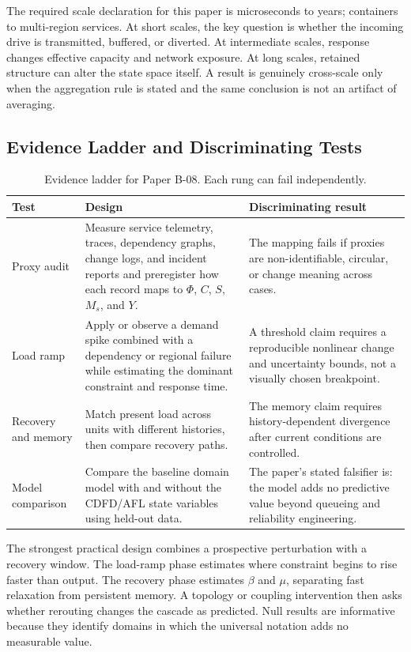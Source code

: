 \documentclass[11pt,a4paper]{article}
\begin{document}
The required scale declaration for this paper is microseconds to years; containers to multi-region services. At short
scales, the key question is whether the incoming drive is transmitted,
buffered, or diverted. At intermediate scales, response changes effective
capacity and network exposure. At long scales, retained structure can alter the
state space itself. A result is genuinely cross-scale only when the aggregation
rule is stated and the same conclusion is not an artifact of averaging.

\subsection{Evidence Ladder and Discriminating Tests}

\begin{table}[htbp]
\centering
\small
\caption{Evidence ladder for Paper B-08. Each rung can fail independently.}
\begin{tabularx}{\textwidth}{|p{}|X|X|}
\hline
\textbf{Test} & \textbf{Design} & \textbf{Discriminating result} \\
\hline
Proxy audit & Measure service telemetry, traces, dependency graphs, change logs, and incident reports and preregister how each record maps to $\Phi$, $C$, $S$, $M_s$, and $Y$. & The mapping fails if proxies are non-identifiable, circular, or change meaning across cases. \\
\hline
Load ramp & Apply or observe a demand spike combined with a dependency or regional failure while estimating the dominant constraint and response time. & A threshold claim requires a reproducible nonlinear change and uncertainty bounds, not a visually chosen breakpoint. \\
\hline
Recovery and memory & Match present load across units with different histories, then compare recovery paths. & The memory claim requires history-dependent divergence after current conditions are controlled. \\
\hline
Model comparison & Compare the baseline domain model with and without the CDFD/AFL state variables using held-out data. & The paper's stated falsifier is: the model adds no predictive value beyond queueing and reliability engineering. \\
\hline
\end{tabularx}
\end{table}

The strongest practical design combines a prospective perturbation with a
recovery window. The load-ramp phase estimates where constraint begins to rise
faster than output. The recovery phase estimates $\beta$ and $\mu$, separating
fast relaxation from persistent memory. A topology or coupling intervention
then asks whether rerouting changes the cascade as predicted. Null results are
informative because they identify domains in which the universal notation adds
no measurable value.
\end{document}
